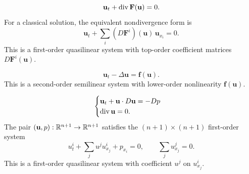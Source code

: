\begin{example}
\label{ex:system-conservation-laws}





$$\mathbf{u}_t + \operatorname{div} \mathbf{F}(\mathbf{u}) = 0.$$
For a classical solution, the equivalent nondivergence form is
$$\mathbf{u}_t + \sum_i (D\mathbf{F}^i)(\mathbf{u})\,\mathbf{u}_{x_i} = 0.$$
This is a first-order quasilinear system with top-order coefficient matrices
$D\mathbf{F}^i(\mathbf{u})$.
\end{example}

\begin{example}
\label{ex:reaction-diffusion-system}





$$\mathbf{u}_t - \Delta\mathbf{u} = \mathbf{f}(\mathbf{u}).$$
This is a second-order semilinear system with lower-order nonlinearity
$\mathbf{f}(\mathbf{u})$.
\end{example}

\begin{example}
\label{ex:euler-equations-incompressible-inviscid}





$$\begin{cases}
\mathbf{u}_t + \mathbf{u} \cdot D\mathbf{u} = -D p \\
\operatorname{div} \mathbf{u} = 0.
\end{cases}$$
The pair $(\mathbf{u},p):\mathbb{R}^{n+1}\to\mathbb{R}^{n+1}$ satisfies the $(n+1)\times(n+1)$ first-order system
$$u^i_t+\sum_j u^j u^i_{x_j}+p_{x_i}=0,\qquad \sum_j u^j_{x_j}=0.$$
This is a first-order quasilinear system with coefficient $u^j$ on
$u^i_{x_j}$.
\end{example}

